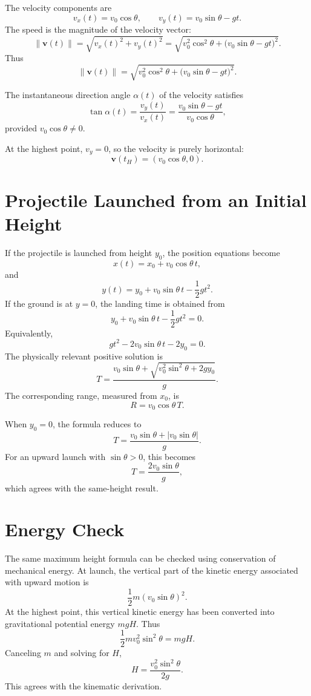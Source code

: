 The velocity components are
\[
v_x(t)=v_0\cos\theta,
\qquad
v_y(t)=v_0\sin\theta-gt.
\]
The speed is the magnitude of the velocity vector:
\[
\lVert \mathbf{v}(t)\rVert
=\sqrt{v_x(t)^2+v_y(t)^2}
=\sqrt{v_0^2\cos^2\theta+\bigl(v_0\sin\theta-gt\bigr)^2}.
\]
Thus
\[
\boxed{\lVert \mathbf{v}(t)\rVert
=\sqrt{v_0^2\cos^2\theta+\bigl(v_0\sin\theta-gt\bigr)^2}.}
\]

The instantaneous direction angle \(\alpha(t)\) of the velocity satisfies
\[
\tan\alpha(t)=\frac{v_y(t)}{v_x(t)}
=\frac{v_0\sin\theta-gt}{v_0\cos\theta},
\]
provided \(v_0\cos\theta\neq 0\).

At the highest point, \(v_y=0\), so the velocity is purely horizontal:
\[
\mathbf{v}(t_H)=(v_0\cos\theta,0).
\]

\section{Projectile Launched from an Initial Height}

If the projectile is launched from height \(y_0\), the position equations become
\[
x(t)=x_0+v_0\cos\theta\,t,
\]
and
\[
y(t)=y_0+v_0\sin\theta\,t-\frac{1}{2}gt^2.
\]
If the ground is at \(y=0\), the landing time is obtained from
\[
y_0+v_0\sin\theta\,t-\frac{1}{2}gt^2=0.
\]
Equivalently,
\[
gt^2-2v_0\sin\theta\,t-2y_0=0.
\]
The physically relevant positive solution is
\[
\boxed{T=\frac{v_0\sin\theta+\sqrt{v_0^2\sin^2\theta+2gy_0}}{g}.}
\]
The corresponding range, measured from \(x_0\), is
\[
\boxed{R=v_0\cos\theta\,T.}
\]

When \(y_0=0\), the formula reduces to
\[
T=\frac{v_0\sin\theta+|v_0\sin\theta|}{g}.
\]
For an upward launch with \(\sin\theta>0\), this becomes
\[
T=\frac{2v_0\sin\theta}{g},
\]
which agrees with the same-height result.

\section{Energy Check}

The same maximum height formula can be checked using conservation of mechanical
energy. At launch, the vertical part of the kinetic energy associated with
upward motion is
\[
\frac{1}{2}m(v_0\sin\theta)^2.
\]
At the highest point, this vertical kinetic energy has been converted into
gravitational potential energy \(mgH\). Thus
\[
\frac{1}{2}m v_0^2\sin^2\theta=mgH.
\]
Canceling \(m\) and solving for \(H\),
\[
H=\frac{v_0^2\sin^2\theta}{2g}.
\]
This agrees with the kinematic derivation.


